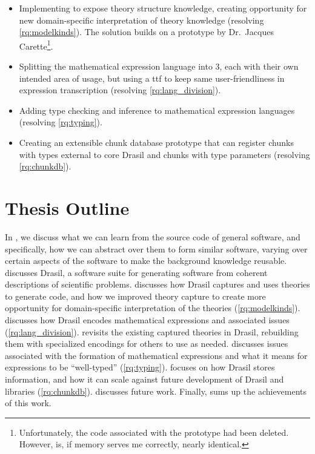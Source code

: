 \begin{itemize}

      \item Implementing \ModelKinds{} to expose theory structure knowledge,
            creating opportunity for new domain-specific interpretation of
            theory knowledge (resolving \ref{rq:modelkinds}). The solution
            builds on a prototype by Dr.\ Jacques Carette\footnote{Unfortunately,
                  the code associated with the prototype had been deleted. However,
                   is, if memory serves me
                  correctly, nearly identical.}.

      \item Splitting the mathematical expression language into 3, each with
            their own intended area of usage, but using a \acs{ttf}
            \cite{Carette2009} to keep same user-friendliness in expression
            transcription (resolving \ref{rq:lang_division}).

      \item Adding type checking and inference to mathematical expression
            languages (resolving \ref{rq:typing}).

      \item Creating an extensible chunk database prototype that can register
            chunks with types external to core Drasil and chunks with type
            parameters (resolving \ref{rq:chunkdb}).

\end{itemize}

\section{Thesis Outline}
\label{chap:intro:sec:thesis-outline}

In , we discuss what we can learn from the source code of
general software, and specifically, how we can abstract over them to form
similar software, varying over certain aspects of the software to make the
background knowledge reusable.  discusses Drasil, a software
suite for generating software from coherent descriptions of scientific problems.
 discusses how Drasil captures and uses theories to
generate code, and how we improved theory capture to create more opportunity for
domain-specific interpretation of the theories (\ref{rq:modelkinds}).
 discusses how Drasil encodes mathematical expressions
and associated issues (\ref{rq:lang_division}). 
revisits the existing captured theories in Drasil, rebuilding them with
specialized encodings for others to use as needed. 
discusses issues associated with the formation of mathematical expressions and
what it means for expressions to be ``well-typed'' (\ref{rq:typing}).
 focuses on how Drasil stores information, and how it
can scale against future development of Drasil and libraries (\ref{rq:chunkdb}).
 discusses future work. Finally, 
sums up the achievements of this work.
